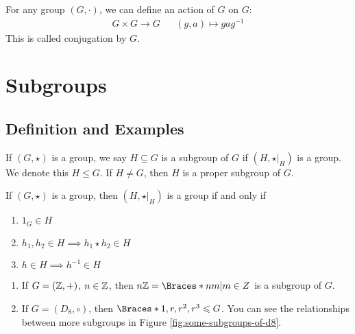 \documentclass[a5paper]{article}
\begin{document}
\begin{definition}[Conjugation]
	For any group $(G,\cdot)$, we can define an action of $G$ on $G$:
  \begin{align*}
    G\times G\longrightarrow G &&
    (g,a)\longmapsto gag^{-1}
  \end{align*}
  This is called conjugation by $G$.
\end{definition}

\section{Subgroups}
\label{sec:subgroups}
\subsection{Definition and Examples} %
\label{sub:subgroups-definitions-and-examples}
\begin{definition}
	If $(G,\star)$ is a group, we say $H\subseteq G$ is a subgroup of $G$ if
  $(H,\star|_H)$ is a group. We denote this $H\leqslant G$. If $H\neq G$, then
  $H$ is a proper subgroup of $G$.
\end{definition}

\begin{lemma}
	If $(G,\star)$ is a group, then $(H,\star|_H)$ is a group if and only if
  \begin{enumerate}%
    \item $1_G\in H$
    \item $h_1,h_2\in H\implies h_1\star h_2\in H$
    \item $h\in H\implies h^{-1}\in H$
  \end{enumerate}
\end{lemma}

\begin{example}[Subgroup]
	\begin{enumerate}
    \item If $G=(\mathbb{Z},+)$, $n\in\mathbb{Z}$, then $n\Z=\braces{nm|m\in Z}$ is a subgroup
      of $G$.
    \item If $G=(D_8,\circ)$, then $\braces{1,r,r^2,r^3}\leqslant G$. 
      You can see the relationships between more subgroups in Figure
      \ref{fig:some-subgroups-of-d8}.
  \end{enumerate}
\end{example}
\end{document}
